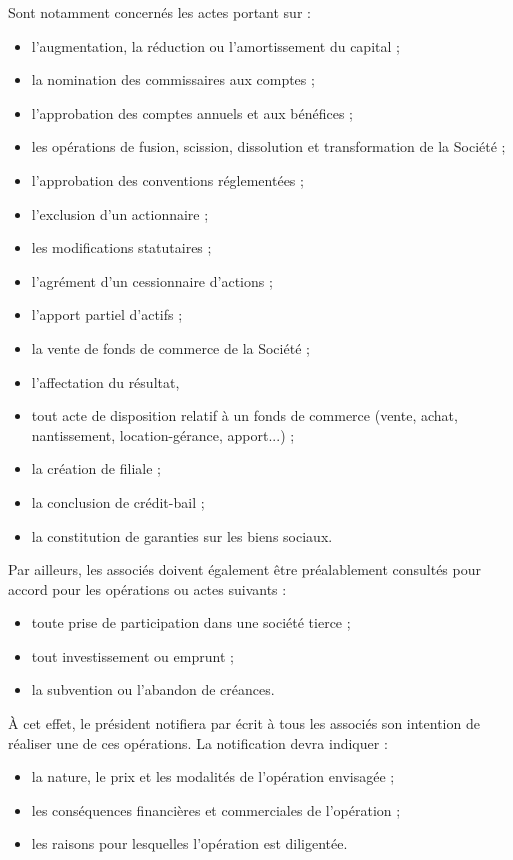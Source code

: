 \documentclass[a4paper,12pt]{report}
\begin{document}
Sont notamment concernés les actes portant sur :
\begin{itemize}
	\item l'augmentation, la réduction ou l'amortissement du capital ;
	\item la nomination des commissaires aux comptes ;
	\item l'approbation des comptes annuels et aux bénéfices ;
	\item les opérations de fusion, scission, dissolution et transformation de la Société ;
	\item l'approbation des conventions réglementées ;
	\item l'exclusion d'un actionnaire ;
	\item les modifications statutaires ;
	\item l'agrément d'un cessionnaire d'actions ;
	\item l'apport partiel d'actifs ;
	\item la vente de fonds de commerce de la Société ;
	\item l'affectation du résultat,
	\item tout acte de disposition relatif à un fonds de commerce (vente, achat, nantissement, location-gérance, apport...) ;
	\item la création de filiale ;
	\item la conclusion de crédit-bail ;
	\item la constitution de garanties sur les biens sociaux.
\end{itemize}

Par ailleurs, les associés doivent également être préalablement consultés pour accord pour les opérations ou actes suivants :
\begin{itemize}
	\item toute prise de participation dans une société tierce ;
	\item tout investissement ou emprunt ;
	\item la subvention ou l'abandon de créances.
\end{itemize}

À cet effet, le président notifiera par écrit à tous les associés son intention de réaliser une de ces opérations. La notification devra indiquer :
\begin{itemize}
	\item la nature, le prix et les modalités de l'opération envisagée ;
	\item les conséquences financières et commerciales de l'opération ;
	\item les raisons pour lesquelles l'opération est diligentée.
\end{itemize}
\end{document}
